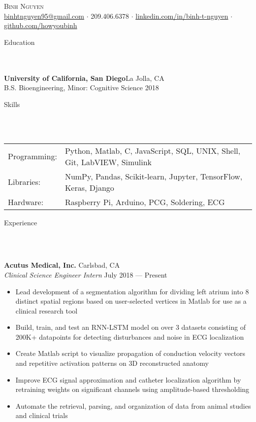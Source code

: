 \documentclass[a4paper]{article}
\newcommand{\lineunder} {
    \vspace*{-8pt} \\
    \hspace*{-18pt} \hrulefill \\
}
\newcommand{\header} [1] {
    {\hspace*{-18pt}\vspace*{6pt} \Large{#1} }
    \vspace*{-6pt} 
    \lineunder
}
\begin{document}
\vspace*{-40pt}

    

\vspace*{-10pt}
\begin{center}
	{\Huge \scshape {Binh Nguyen}}\\
	\href{mailto:binhtnguyen95@gmail.com}{binhtnguyen95@gmail.com} $\cdot$ 
	209.406.6378 $\cdot$ 
	\href{https://www.linkedin.com/in/binh-t-nguyen}{linkedin.com/in/binh-t-nguyen} $\cdot$ 
	\href{https://www.github.com/howyoubinh}{github.com/howyoubinh}\\
\end{center}

\header{Education}
\textbf{University of California, San Diego}\hfill La Jolla, CA\\
B.S. Bioengineering, Minor: Cognitive Science \hfill 2018\\
\vspace{2mm}

\header{Skills}
\begin{tabular}{ l l }
\hspace{-1mm}
	Programming: & Python, Matlab, C, JavaScript, SQL, UNIX, Shell, Git, LabVIEW, Simulink  \\
	Libraries:   & NumPy, Pandas, Scikit-learn, Jupyter, TensorFlow, Keras, Django         \\
	Hardware:    & Raspberry Pi, Arduino, PCG, Soldering, ECG \\
\end{tabular}
\vspace{2mm}

\header{Experience}
\vspace{1mm}

\textbf{Acutus Medical, Inc.} \hfill Carlsbad, CA\\
\textit{Clinical Science Engineer Intern} \hfill July 2018 --- Present\\
\vspace{-2mm}
\begin{itemize} \itemsep 0.1pt
	\item Lead development of a segmentation algorithm for dividing left atrium into 8 distinct spatial regions based on user-selected vertices in Matlab for use as a clinical research tool
	\item Build, train, and test an RNN-LSTM model on over 3 datasets consisting of 200K+ datapoints for detecting disturbances and noise in ECG localization
	\item Create Matlab script to visualize propagation of conduction velocity vectors and repetitive activation patterns on 3D reconstructed anatomy
	\item Improve ECG signal approximation and catheter localization algorithm by retraining weights on significant channels using amplitude-based thresholding
	\item Automate the retrieval, parsing, and organization of data from animal studies and clinical trials
\end{itemize}
\end{document}
